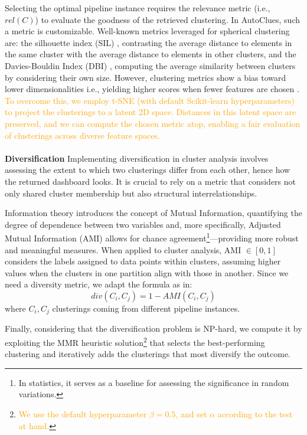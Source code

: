 \documentclass[runningheads]{llncs}
\begin{document}
Selecting the optimal pipeline instance requires the relevance metric (i.e., $rel(C)$) to evaluate the goodness of the retrieved clustering.
In AutoClues, such a metric is customizable.
Well-known metrics leveraged for spherical clustering are: the silhouette index (SIL) \cite{zhu2010clustering}, contrasting the average distance to elements in the same cluster with the average distance to elements in other clusters, and the Davies-Bouldin Index (DBI) \cite{dbi}, computing the average similarity between clusters by considering their own size.
However, clustering metrics show a bias toward lower dimensionalities i.e., yielding higher scores when fewer features are chosen \cite{lensen2017using,hancer2020new}. 
\textcolor{orange}{To overcome this, we employ t-SNE \cite{van2008visualizing} (with default Scikit-learn hyperparameters) to project the clusterings to a latent 2D space.
Distances in this latent space are preserved, and we can compute the chosen metric atop,  enabling a fair evaluation of clusterings across diverse feature spaces.}
%
\\
\\
\textbf{Diversification}
Implementing diversification in cluster analysis involves assessing the extent to which two clusterings differ from each other, hence how the returned dashboard looks.
It is crucial to rely on a metric that considers not only shared cluster membership but also structural interrelationships.

Information theory introduces the concept of Mutual Information, quantifying the degree of dependence between two variables and, more specifically, Adjusted Mutual Information (AMI) allows for chance agreement\footnote{In statistics, it serves as a baseline for assessing the significance in random variations.}---providing more robust and meaningful measures.
When applied to cluster analysis, AMI $\in [0, 1]$ considers the labels assigned to data points within clusters, assuming higher values when the clusters in one partition align with those in another.
Since we need a diversity metric, we adapt the formula as in:
$$div(C_i, C_j) = 1- AMI(C_i, C_j)$$ 
where $C_i, C_j$ clusterings coming from different pipeline instances.

Finally, considering that the diversification problem is NP-hard, we compute it by exploiting the MMR heuristic solution\footnote{\textcolor{orange}{We use the default hyperparameter $\beta = 0.5$, and set $\alpha$ according to the test at hand.}} \cite{vieira2011query} that selects the best-performing clustering and iteratively adds the clusterings that most diversify the outcome.
\end{document}
